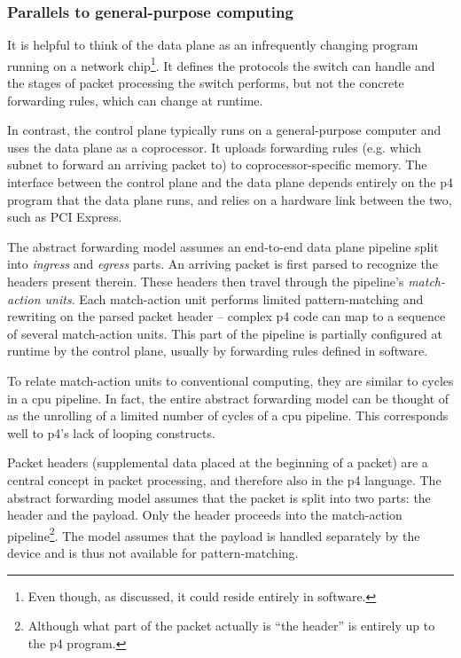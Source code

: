 \subsubsection*{Parallels to general-purpose computing}

It is helpful to think of the data plane as an infrequently changing program
running on a network chip\footnote{Even though, as discussed, it could reside
entirely in software.}. It defines the protocols the switch can handle and the
stages of packet processing the switch performs, but not the concrete forwarding
rules, which can change at runtime.

In contrast, the control plane typically runs on a general-purpose computer and
uses the data plane as a coprocessor. It uploads forwarding rules (e.g. which
subnet to forward an arriving packet to) to coprocessor-specific memory. The
interface between the control plane and the data plane depends entirely on the
\acrshort{p4} program that the data plane runs, and relies on a hardware link
between the two, such as PCI Express.

The abstract forwarding model assumes an end-to-end data plane pipeline split
into \emph{ingress} and \emph{egress} parts. An arriving packet is first parsed
to recognize the headers present therein. These headers then travel through the
pipeline's \emph{match-action units}. Each match-action unit performs limited
pattern-matching and rewriting on the parsed packet header -- complex
\acrshort{p4} code can map to a sequence of several match-action units. This
part of the pipeline is partially configured at runtime by the control plane,
usually by forwarding rules defined in software.

To relate match-action units to conventional computing, they are similar to
cycles in a \acrshort{cpu} pipeline. In fact, the entire abstract forwarding
model can be thought of as the unrolling of a limited number of cycles of a
\acrshort{cpu} pipeline. This corresponds well to \acrshort{p4}'s lack of
looping constructs.

Packet headers (supplemental data placed at the beginning of a packet) are a
central concept in packet processing, and therefore also in the \acrshort{p4}
language. The abstract forwarding model assumes that the packet is split into
two parts: the header and the payload. Only the header proceeds into the
match-action pipeline\footnote{Although what part of the packet actually is
``the header'' is entirely up to the \acrshort{p4} program.}. The model assumes
that the payload is handled separately by the device and is thus not available
for pattern-matching.

